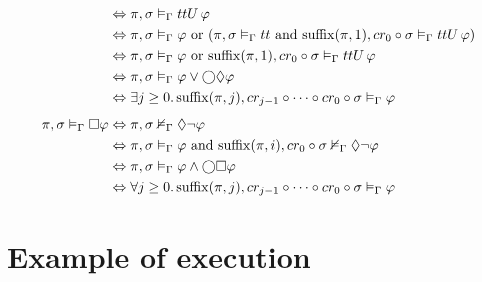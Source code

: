 \begin{align}
    &\Leftrightarrow {\pi}, {\sigma} \vDash_{\Gamma} {{tt}U\,{\varphi}} \notag \\
    &\Leftrightarrow {\pi}, {\sigma} \vDash_{\Gamma} {\varphi} \text{ or }
        ({\pi}, {\sigma} \vDash_{\Gamma} {tt} \text { and } {\operatorname{suffix}(\pi,1)}, {cr_0 \circ \sigma} \vDash_{\Gamma} {{tt}U\,{\varphi}}) \notag \\
    &\Leftrightarrow {\pi}, {\sigma} \vDash_{\Gamma} {\varphi} \text{ or }
        {\operatorname{suffix}(\pi,1)}, {cr_0 \circ \sigma} \vDash_{\Gamma} {{tt}U\,{\varphi}} \notag \\
    &\Leftrightarrow {\pi}, {\sigma} \vDash_{\Gamma} {\varphi} \lor \bigcirc{\Diamond{\varphi}} \label{eq:eventuallyexp} \\
    &\Leftrightarrow \exists {j \geq 0} \ldotp {{\operatorname{suffix}(\pi,j)}, {cr_{j-1} \circ \cdots \circ cr_0 \circ \sigma} \vDash_{\Gamma} {\varphi}} \label{eq:eventuallysem} \\[1ex]
  {\pi}, {\sigma} \vDash_{\Gamma} {\Box{\varphi}}
    &\Leftrightarrow {\pi}, {\sigma} \nvDash_{\Gamma} {\Diamond{\neg\varphi}} \notag \\
    &\Leftrightarrow {\pi}, {\sigma} \vDash_{\Gamma} {\varphi} \text{ and }
        {\operatorname{suffix}(\pi,i)}, {cr_0 \circ \sigma} \nvDash_{\Gamma} {\Diamond{\neg\varphi}} \notag \\
    &\Leftrightarrow {\pi}, {\sigma} \vDash_{\Gamma} {\varphi \land \bigcirc{\Box{\varphi}}} \label{eq:foreverexp} \\
    &\Leftrightarrow \forall {j \geq 0} \ldotp {{\operatorname{suffix}(\pi,j)}, {cr_{j-1} \circ \cdots \circ cr_0 \circ \sigma} \vDash_{\Gamma} {\varphi}} \label{eq:foreversem}
\end{align}

\section{Example of execution}\label{sec:execexample}

